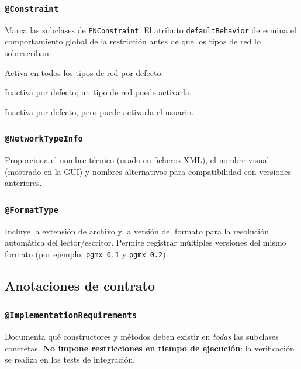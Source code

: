 \documentclass[12pt,a4paper,spanish]{article}
\begin{document}
\subsubsection{\texttt{@Constraint}}

Marca las subclases de \texttt{PNConstraint}. El atributo \texttt{defaultBehavior}
determina el comportamiento global de la restricción antes de que los tipos de
red lo sobrescriban:

\begin{description}[leftmargin=2em]
    \item[\texttt{YES}] Activa en todos los tipos de red por defecto.
    \item[\texttt{NO}] Inactiva por defecto; un tipo de red puede activarla.
    \item[\texttt{OPTIONAL}] Inactiva por defecto, pero puede activarla el usuario.
\end{description}

\subsubsection{\texttt{@NetworkTypeInfo}}

Proporciona el nombre técnico (usado en ficheros XML), el nombre visual (mostrado
en la GUI) y nombres alternativos para compatibilidad con versiones anteriores.

\subsubsection{\texttt{@FormatType}}

Incluye la extensión de archivo y la versión del formato para la resolución
automática del lector/escritor. Permite registrar múltiples versiones del mismo
formato (por ejemplo, \texttt{pgmx~0.1} y \texttt{pgmx~0.2}).

\subsection{Anotaciones de contrato}
\label{sec:contrato}

\subsubsection{\texttt{@ImplementationRequirements}}

Documenta qué constructores y métodos deben existir en \emph{todas} las subclases
concretas. \textbf{No impone restricciones en tiempo de ejecución}: la verificación
se realiza en los tests de integración.
\end{document}
